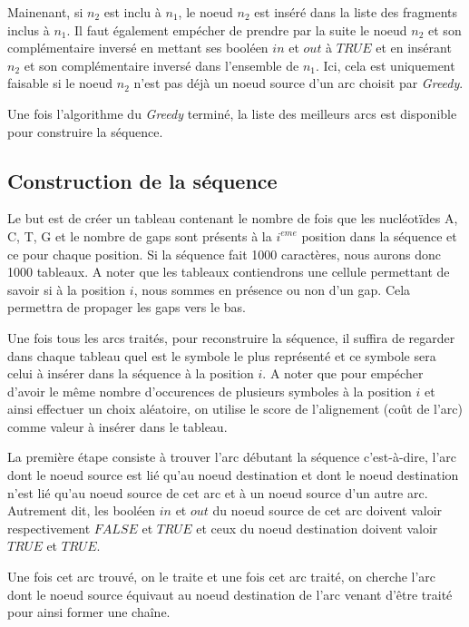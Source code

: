 \documentclass[12pt,a4paper,final]{article}
\begin{document}
Mainenant, si $n_2$ est inclu à $n_1$, le noeud $n_2$ est inséré dans la liste des fragments inclus à $n_1$.  Il faut également empécher de prendre par la suite le noeud $n_2$ et son complémentaire inversé en mettant ses booléen $in$ et $out$ à $TRUE$ et en insérant $n_2$ et son complémentaire inversé dans l'ensemble de $n_1$.  Ici, cela est uniquement faisable si le noeud $n_2$ n'est pas déjà un noeud source d'un arc choisit par \textit{Greedy}.\medskip

Une fois l'algorithme du \textit{Greedy} terminé, la liste des meilleurs arcs est disponible pour construire la séquence.

\subsection{Construction de la séquence}

Le but est de créer un tableau contenant le nombre de fois que les nucléotïdes A, C, T, G et le nombre de gaps sont présents à la $i^{eme}$ position dans la séquence et ce pour chaque position.  Si la séquence fait 1000 caractères, nous aurons donc 1000 tableaux.  A noter que les tableaux contiendrons une cellule permettant de savoir si à la position $i$, nous sommes en présence ou non d'un gap.  Cela permettra de propager les gaps vers le bas.\medskip

Une fois tous les arcs traités, pour reconstruire la séquence, il suffira de regarder dans chaque tableau quel est le symbole le plus représenté et ce symbole sera celui à insérer dans la séquence à la position $i$.  A noter que pour empécher d'avoir le même nombre d'occurences de plusieurs symboles à la position $i$ et ainsi effectuer un choix aléatoire, on utilise le score de l'alignement (coût de l'arc) comme valeur à insérer dans le tableau.\medskip

La première étape consiste à trouver l'arc débutant la séquence c'est-à-dire, l'arc dont le noeud source est lié qu'au noeud destination et dont le noeud destination n'est lié qu'au noeud source de cet arc et à un noeud source d'un autre arc.  Autrement dit, les booléen $in$ et $out$ du noeud source de cet arc doivent valoir respectivement $FALSE$ et $TRUE$  et ceux du noeud destination doivent valoir $TRUE$ et $TRUE$.\medskip

Une fois cet arc trouvé, on le traite et une fois cet arc traité, on cherche l'arc dont le noeud source équivaut au noeud destination de l'arc venant d'être traité pour ainsi former une chaîne.\medskip
\end{document}
